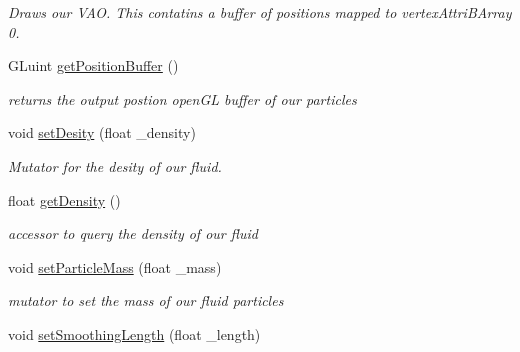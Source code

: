 \begin{DoxyCompactItemize}
\begin{DoxyCompactList}\small\item\em Draws our V\-A\-O. This contatins a buffer of positions mapped to vertex\-Attri\-B\-Array 0. \end{DoxyCompactList}\item 
\hypertarget{class_s_p_h_engine_aee51f7802e02c838732d9acab37da89a}{G\-Luint \hyperlink{class_s_p_h_engine_aee51f7802e02c838732d9acab37da89a}{get\-Position\-Buffer} ()}\label{class_s_p_h_engine_aee51f7802e02c838732d9acab37da89a}

\begin{DoxyCompactList}\small\item\em returns the output postion open\-G\-L buffer of our particles \end{DoxyCompactList}\item 
\hypertarget{class_s_p_h_engine_acbc638f7ab8fa2ab356dadf677df10c6}{void \hyperlink{class_s_p_h_engine_acbc638f7ab8fa2ab356dadf677df10c6}{set\-Desity} (float \-\_\-density)}\label{class_s_p_h_engine_acbc638f7ab8fa2ab356dadf677df10c6}

\begin{DoxyCompactList}\small\item\em Mutator for the desity of our fluid. \end{DoxyCompactList}\item 
\hypertarget{class_s_p_h_engine_a8ee29d26f9451d81a07abde5b1aa53c6}{float \hyperlink{class_s_p_h_engine_a8ee29d26f9451d81a07abde5b1aa53c6}{get\-Density} ()}\label{class_s_p_h_engine_a8ee29d26f9451d81a07abde5b1aa53c6}

\begin{DoxyCompactList}\small\item\em accessor to query the density of our fluid \end{DoxyCompactList}\item 
\hypertarget{class_s_p_h_engine_a0f937d1c09511f302455f102fae167c3}{void \hyperlink{class_s_p_h_engine_a0f937d1c09511f302455f102fae167c3}{set\-Particle\-Mass} (float \-\_\-mass)}\label{class_s_p_h_engine_a0f937d1c09511f302455f102fae167c3}

\begin{DoxyCompactList}\small\item\em mutator to set the mass of our fluid particles \end{DoxyCompactList}\item 
\hypertarget{class_s_p_h_engine_a196e04ba23d9d9c73924f3af8a8240ed}{void \hyperlink{class_s_p_h_engine_a196e04ba23d9d9c73924f3af8a8240ed}{set\-Smoothing\-Length} (float \-\_\-length)}\label{class_s_p_h_engine_a196e04ba23d9d9c73924f3af8a8240ed}


\end{DoxyCompactItemize}
